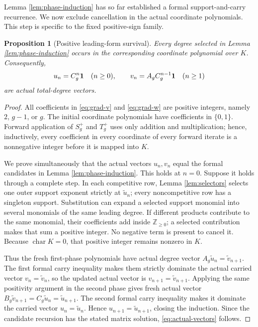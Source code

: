 \documentclass[11pt]{article}
\newtheorem{proposition}[theorem]{Proposition}
\theoremstyle{remark}
\numberwithin{equation}{section}
\begin{document}
Lemma \ref{lem:phase-induction} has so far established a formal
support-and-carry recurrence.  We now exclude cancellation in the actual
coordinate polynomials.  This step is specific to the fixed positive-sign
family.

\begin{proposition}[Positive leading-form survival]\label{prop:survival}
Every degree selected in Lemma \ref{lem:phase-induction} occurs in the
corresponding coordinate polynomial over \(K\).  Consequently,
\begin{equation}\label{eq:actual-vectors}
u_n=C_g^n\mathbf{1}\quad(n\geq0),\qquad
v_n=A_gC_g^{n-1}\mathbf{1}\quad(n\geq1)
\end{equation}
are actual total-degree vectors.
\end{proposition}

\begin{proof}
All coefficients in \eqref{eq:grad-v} and \eqref{eq:grad-w} are positive
integers, namely \(2\), \(g-1\), or \(g\).  The initial coordinate
polynomials have coefficients in \(\{0,1\}\).  Forward application of
\(S_g^+\) and \(T_g^+\) uses only addition and multiplication; hence,
inductively, every coefficient in every coordinate of every forward iterate
is a nonnegative integer before it is mapped into \(K\).

We prove simultaneously that the actual vectors \(u_n,v_n\) equal the
formal candidates in Lemma \ref{lem:phase-induction}.  This holds at
\(n=0\).  Suppose it holds through a complete step.  In each competitive
row, Lemma \ref{lem:selectors} selects one outer support exponent strictly
at \(\widetilde u_n\); every noncompetitive row has a singleton support.
Substitution can expand a selected support monomial into several monomials
of the same leading degree.  If different products contribute to the same
monomial, their coefficients add inside \(\mathbb Z_{\geq0}\); a selected
contribution makes that sum a positive integer.  No negative term is
present to cancel it.  Because \(\operatorname{char}K=0\), that positive
integer remains nonzero in \(K\).

Thus the fresh first-phase polynomials have actual degree vector
\(A_g\widetilde u_n=\widetilde v_{n+1}\).  The first formal carry
inequality makes them strictly dominate the actual carried vector
\(v_n=\widetilde v_n\), so the updated actual vector is
\(v_{n+1}=\widetilde v_{n+1}\).  Applying the same positivity argument in
the second phase gives fresh actual vector
\(B_g\widetilde v_{n+1}=C_g\widetilde u_n
=\widetilde u_{n+1}\).  The second formal carry inequality makes it dominate
the carried vector \(u_n=\widetilde u_n\).  Hence
\(u_{n+1}=\widetilde u_{n+1}\), closing the induction.  Since the candidate
recursion has the stated matrix solution, \eqref{eq:actual-vectors}
follows.
\end{proof}
\end{document}
